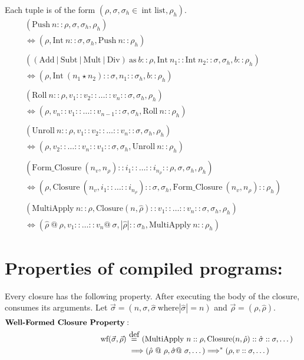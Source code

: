 \documentclass[11pt]{article}
\newcommand\myeq{\stackrel{\mathclap{\normalfont\mbox{def}}}{=}}
\begin{document}
Each tuple is of the form $(\rho, \sigma, \sigma_h \in\ \text{int list}, \rho_h)$. 
\begin{gather*}
    (\text{Push}\ n::\rho, \sigma, \sigma_h, \rho_h)\\
    \Longleftrightarrow (\rho, \text{Int}\ n::\sigma, \sigma_h, \text{Push}\ n::\rho_h) \\ \\
    ((\text{Add}\ |\ \text{Subt}\ |\ \text{Mult}\ |\ \text{Div})\ \text{as}\ b::\rho, \text{Int}\ n_1::\text{Int}\ n_2::\sigma, \sigma_h, b::\rho_h)\\
    \Longleftrightarrow (\rho, \text{Int}\ (n_1 \star n_2)::\sigma, n_1::\sigma_h, b::\rho_h)\\ \\
    (\text{Roll}\ n::\rho, v_1::v_2::\dots::v_n::\sigma, \sigma_h, \rho_h)\\
    \Longleftrightarrow (\rho, v_n::v_1::\dots::v_{n-1}::\sigma, \sigma_h, \text{Roll}\ n::\rho_h)\\ \\
    (\text{Unroll}\ n::\rho, v_1::v_2::\dots::v_n::\sigma, \sigma_h, \rho_h)\\
    \Longleftrightarrow (\rho, v_2::\dots::v_n::v_1::\sigma, \sigma_h, \text{Unroll}\ n::\rho_h)\\ \\
    (\text{Form\_Closure}\ (n_v, n_{\rho})::i_1::\dots::i_{n_\rho}::\rho, \sigma, \sigma_h, \rho_h) \\
    \Longleftrightarrow (\rho, \text{Closure}\ (n_v, i_1::\dots::i_{n_{\rho}})::\sigma, \sigma_h, \text{Form\_Closure}\ (n_v, n_{\rho})::\rho_h)\\ \\
    (\text{MultiApply}\ n::\rho, \text{Closure} (n, \hat{\rho})::v_1::\dots::v_n::\sigma, \sigma_h, \rho_h) \\
    \Longleftrightarrow (\hat{\rho}\ @\ \rho, v_1::\dots::v_n @\ \sigma, |\hat{\rho}|::\sigma_h, \text{MultiApply}\ n::\rho_h)
\end{gather*}

\break{}

\section*{Properties of compiled programs:}

Every closure has the following property. After executing the body of the closure, consumes its arguments. Let $\vec{\sigma} = (n, \sigma, \hat{\sigma}\ \text{where} |\hat{\sigma}| = n)$ and $\vec{\rho} = (\rho, \hat{\rho})$. 
\begin{align*}
\textbf{Well-Formed Closure Property}: \\
    \text{wf} (\vec{\sigma}, \vec{\rho})\ &\myeq\ (\text{MultiApply}\ n::\rho, \text{Closure} (n, \hat{\rho})::\hat{\sigma}::\sigma, \dots)\\
    &\Longrightarrow (\hat{\rho}\ @\ \rho, \hat{\sigma} @\ \sigma, \dots) \Longrightarrow^* (\rho, v::\sigma, \dots)
\end{align*}
\end{document}
